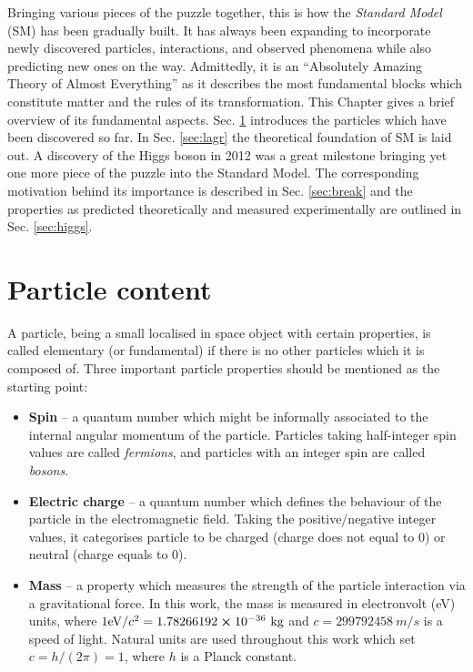 Bringing various pieces of the puzzle together, this is how the \textit{Standard Model} (SM) has been gradually built. It has always been expanding to incorporate newly discovered particles, interactions, and observed phenomena while also predicting new ones on the way. Admittedly, it is an \enquote{Absolutely Amazing Theory of Almost Everything} \cite{Mulders:2019vhb} as it describes the most fundamental blocks which constitute matter and the rules of its transformation. This Chapter gives a brief overview of its fundamental aspects. Sec. \ref{sec:particles} introduces the particles which have been discovered so far. In Sec. \ref{sec:lagr} the theoretical foundation of SM is laid out. A discovery of the Higgs boson in 2012 \cite{ATLAS:2012yve,CMS:2012qbp} was a great milestone bringing yet one more piece of the puzzle into the Standard Model. The corresponding motivation behind its importance is described in Sec. \ref{sec:break} and the properties as predicted theoretically and measured experimentally are outlined in Sec. \ref{sec:higgs}.

\section{Particle content}\label{sec:particles}

A particle, being a small localised in space object with certain properties, is called elementary (or fundamental) if there is no other particles which it is composed of. Three important particle properties should be mentioned as the starting point:
\begin{itemize}
    \item \textbf{Spin} -- a quantum number which might be informally associated to the internal angular momentum of the particle. Particles taking half-integer spin values are called \textit{fermions}, and particles with an integer spin are called \textit{bosons}.
    
    \item \textbf{Electric charge} -- a quantum number which defines the behaviour of the particle in the electromagnetic field. Taking the positive/negative integer values, it categorises particle to be charged (charge does not equal to 0) or neutral (charge equals to 0).
    
    \item \textbf{Mass} -- a property which measures the strength of the particle interaction via a gravitational force. In this work, the mass is measured in electronvolt (eV) units, where $1 \text{eV}/c^2 = 1.78266192 \cross 10^{-36} ~\text{kg}$ and $c = 299 792 458 ~m/s$ is a speed of light. Natural units are used throughout this work which set $c = h/(2\pi) = 1$, where $h$ is a Planck constant.  
\end{itemize}

